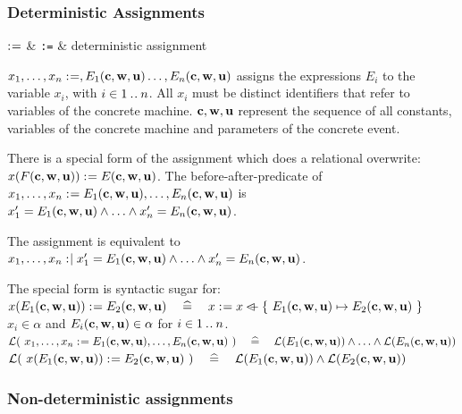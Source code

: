 \subsubsection{Deterministic Assignments}
\label{deterministic_assignments}
\begin{rrnames}
  $\mathrel{:\mkern1mu=}$ & \texttt{:=} & deterministic assignment
\end{rrnames}
\begin{rodinrefentry}
  \rrdesc
    $x_1,\ldots,x_n \mathrel{:\mkern1mu=} ,E_{1}(\mathbf{c},\mathbf{w},\mathbf{u})\ldots,E_{n}(\mathbf{c},\mathbf{w},\mathbf{u})$
    assigns the expressions $E_i$ to the variable $x_i$, with $i\in1\mathbin{.\mkern1mu.} n$.
    All $x_i$ must be distinct identifiers that refer to variables of the concrete machine.
    $\mathbf{c},\mathbf{w},\mathbf{u}$ represent the sequence of all constants, 
    variables of the concrete machine and parameters of the concrete event.

    There is a special form of the assignment which does a relational overwrite:\\
    $x(F(\mathbf{c},\mathbf{w},\mathbf{u})) \mathrel{:\mkern1mu=} E(\mathbf{c},\mathbf{w},\mathbf{u})$.
  \rrdef
    The before-after-predicate of $x_1,\ldots,x_n \mathrel{:\mkern1mu=} E_{1}(\mathbf{c},\mathbf{w},\mathbf{u}),\ldots,E_{n}(\mathbf{c},\mathbf{w},\mathbf{u})$ is\\ $x_1' = E_{1}(\mathbf{c},\mathbf{w},\mathbf{u}) \land \ldots \land x_n' = E_{n}(\mathbf{c},\mathbf{w},\mathbf{u})$.

    The assignment is equivalent to
    $x_1,\ldots,x_n \mathrel{:\mkern1mu\mid} x_1' = E_{1}(\mathbf{c},\mathbf{w},\mathbf{u}) \land \ldots \land x_n' = E_{n}(\mathbf{c},\mathbf{w},\mathbf{u})$.

    The special form is syntactic sugar for:\\
    $x(E_{1}(\mathbf{c},\mathbf{w},\mathbf{u})) \mathrel{:\mkern1mu=} E_{2}(\mathbf{c},\mathbf{w},\mathbf{u})
      \quad\mathrel{\widehat=}\quad 
      x \mathrel{:\mkern1mu=} x \mathbin{\lhd\mkern-9mu-} \{~E_{1}(\mathbf{c},\mathbf{w},\mathbf{u}) \mapsto E_{2}(\mathbf{c},\mathbf{w},\mathbf{u})~\}$
  \rrtypes
    $x_i\in\alpha$ and  $E_{i}(\mathbf{c},\mathbf{w},\mathbf{u})\in\alpha$ for $i \in 1\mathbin{.\mkern1mu.} n$.
  \rrwd
    $\mathcal{L}(~x_1,\ldots,x_n \mathrel{:\mkern1mu=} E_{1}(\mathbf{c},\mathbf{w},\mathbf{u}),\ldots,E_{n}(\mathbf{c},\mathbf{w},\mathbf{u})~)
      \quad\mathrel{\widehat=}\quad 
      \mathcal{L}(E_{1}(\mathbf{c},\mathbf{w},\mathbf{u})) \land \ldots \land \mathcal{L}(E_{n}(\mathbf{c},\mathbf{w},\mathbf{u}))$ \\
    $\mathcal{L}(~x(E_{1}(\mathbf{c},\mathbf{w},\mathbf{u})) \mathrel{:\mkern1mu=} E_{2}(\mathbf{c},\mathbf{w},\mathbf{u})~)
    \quad\mathrel{\widehat=}\quad 
    \mathcal{L}(E_{1}(\mathbf{c},\mathbf{w},\mathbf{u})) \land \mathcal{L}(E_{2}(\mathbf{c},\mathbf{w},\mathbf{u}))$
\end{rodinrefentry}

\subsubsection{Non-deterministic assignments}
\label{nondeterministic_assignments}


